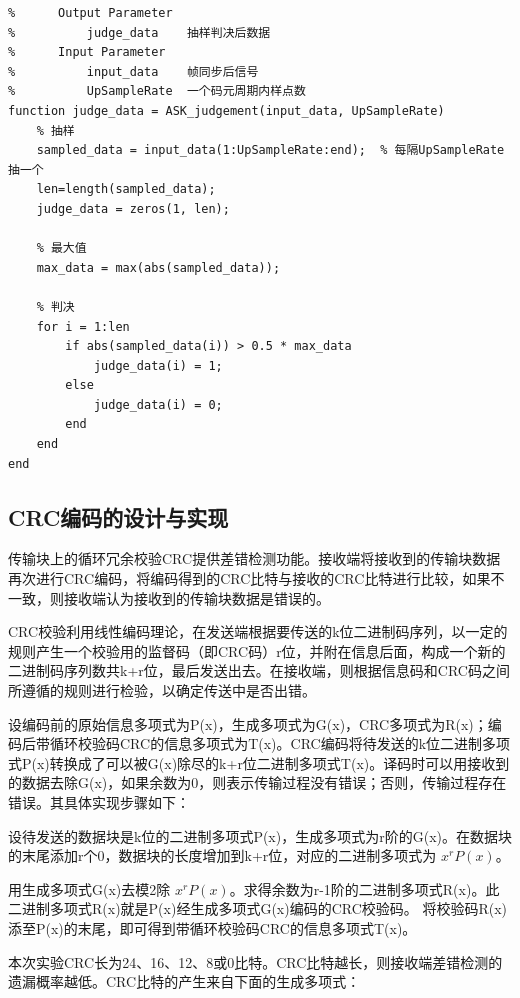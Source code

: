 \documentclass[UTF8]{ctexart}
\begin{document}
\begin{lstlisting}[title=ASK\_judgement.m, frame=shadowbox]
%  Parameter List:       
%      Output Parameter
%          judge_data	 抽样判决后数据
%      Input Parameter
%          input_data	 帧同步后信号
%          UpSampleRate  一个码元周期内样点数
function judge_data = ASK_judgement(input_data, UpSampleRate)
    % 抽样
    sampled_data = input_data(1:UpSampleRate:end);  % 每隔UpSampleRate抽一个
    len=length(sampled_data);
    judge_data = zeros(1, len);

    % 最大值
    max_data = max(abs(sampled_data));

    % 判决
    for i = 1:len
        if abs(sampled_data(i)) > 0.5 * max_data
            judge_data(i) = 1;
        else 
            judge_data(i) = 0;
        end
    end
end
\end{lstlisting}

\subsection{CRC编码的设计与实现}
\label{para.3.3}

传输块上的循环冗余校验CRC提供差错检测功能。接收端将接收到的传输块数据再次进行CRC编码，将编码得到的CRC比特与接收的CRC比特进行比较，如果不一致，则接收端认为接收到的传输块数据是错误的。

CRC校验利用线性编码理论，在发送端根据要传送的k位二进制码序列，以一定的规则产生一个校验用的监督码（即CRC码）r位，并附在信息后面，构成一个新的二进制码序列数共k+r位，最后发送出去。在接收端，则根据信息码和CRC码之间所遵循的规则进行检验，以确定传送中是否出错。

设编码前的原始信息多项式为P(x)，生成多项式为G(x)，CRC多项式为R(x)；编码后带循环校验码CRC的信息多项式为T(x)。CRC编码将待发送的k位二进制多项式P(x)转换成了可以被G(x)除尽的k+r位二进制多项式T(x)。译码时可以用接收到的数据去除G(x)，如果余数为0，则表示传输过程没有错误；否则，传输过程存在错误。其具体实现步骤如下：

设待发送的数据块是k位的二进制多项式P(x)，生成多项式为r阶的G(x)。在数据块的末尾添加r个0，数据块的长度增加到k+r位，对应的二进制多项式为 $x^r P(x)$。

用生成多项式G(x)去模2除 $x^r P(x)$。求得余数为r-1阶的二进制多项式R(x)。此二进制多项式R(x)就是P(x)经生成多项式G(x)编码的CRC校验码。
将校验码R(x)添至P(x)的末尾，即可得到带循环校验码CRC的信息多项式T(x)。

本次实验CRC长为24、16、12、8或0比特。CRC比特越长，则接收端差错检测的遗漏概率越低。CRC比特的产生来自下面的生成多项式：
\end{document}
